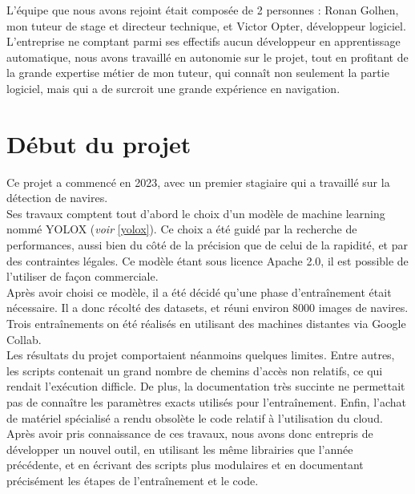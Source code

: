 L'équipe que nous avons rejoint était composée de 2 personnes : Ronan Golhen, mon tuteur de stage et
directeur technique, et Victor Opter, développeur logiciel. L'entreprise ne comptant parmi
ses effectifs aucun développeur en apprentissage automatique, nous avons travaillé en autonomie sur le projet,
tout en profitant de la grande expertise métier de mon tuteur, qui connaît non seulement
la partie logiciel, mais qui a de surcroit une grande expérience en navigation. \\

\section{Début du projet}

Ce projet a commencé en 2023, avec un premier stagiaire qui a travaillé sur la détection de navires. \\

Ses travaux comptent tout d'abord le choix d'un modèle de machine learning nommé YOLOX
(\textit{voir }\ref{yolox}).
Ce choix a été guidé par la recherche de performances, aussi bien du côté de la précision
que de celui de la rapidité, et par des contraintes légales. Ce modèle étant sous
licence Apache 2.0, il est possible de l'utiliser de façon commerciale.\\

Après avoir choisi ce modèle, il a été décidé qu'une phase d'entraînement était nécessaire.
Il a donc récolté des datasets, et réuni environ 8000 images de navires.
Trois entraînements on été réalisés en utilisant des machines distantes via Google Collab. \\

Les résultats du projet comportaient néanmoins quelques limites. Entre autres, les scripts
contenait un grand nombre de chemins d'accès non relatifs, ce qui rendait
l'exécution difficle. De plus, la documentation très succinte ne permettait pas
de connaître les paramètres exacts utilisés pour l'entraînement. Enfin, l'achat de matériel
spécialisé a rendu obsolète le code relatif à l'utilisation du cloud.\\

Après avoir pris connaissance de ces travaux, nous avons donc entrepris de développer 
un nouvel outil, en utilisant les même librairies que l'année précédente, 
et en écrivant des scripts plus modulaires et en documentant précisément
les étapes de l'entraînement et le code.
